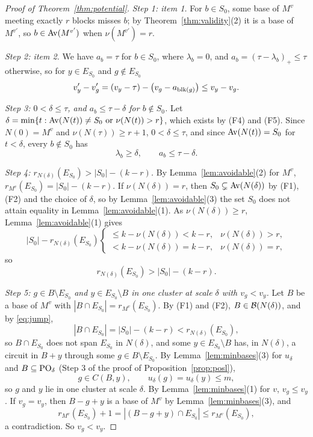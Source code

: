 \begin{proof}[Proof of Theorem~\ref{thm:potential}]
\emph{Step 1: item 1.}  For $b\in S_0$, some base of $M^{v}$ meeting exactly $r$
blocks misses $b$; by Theorem~\ref{thm:validity}(2) it is a base of $M^{v'}$, so
$b\in\operatorname{Av}(M^{v'})$ when $\nu(M^{v'})=r$.

\emph{Step 2: item 2.}  We have $a_b=\tau$ for $b\in S_0$, where $\lambda_b=0$,
and $a_b=(\tau-\lambda_b)_+\le\tau$ otherwise, so for $y\in E_{S_0}$ and
$g\notin E_{S_0}$
\[
  v'_y-v'_g=(v_y-\tau)-\bigl(v_g-a_{\operatorname{blk}(g)}\bigr)\le v_y-v_g.
\]

\emph{Step 3: $0<\delta\le\tau$, and $a_b\le\tau-\delta$ for $b\notin S_0$.}  Let
$\delta=\min\{t:\operatorname{Av}(N(t))\ne S_0\text{ or }\nu(N(t))>r\}$, which exists by (F4)
and (F5).  Since $N(0)=M^{v}$ and $\nu(N(\tau))\ge r+1$, $0<\delta\le\tau$, and
since $\operatorname{Av}(N(t))=S_0$ for $t<\delta$, every $b\notin S_0$ has
\[
  \lambda_b\ge\delta,\qquad a_b\le\tau-\delta.
\]

\emph{Step 4: $r_{N(\delta)}(E_{S_0})>|S_0|-(k-r)$.}  By Lemma~\ref{lem:avoidable}(2) for $M^{v}$,
$r_{M^{v}}(E_{S_0})=|S_0|-(k-r)$.  If $\nu(N(\delta))=r$, then
$S_0\subsetneq\operatorname{Av}(N(\delta))$ by (F1), (F2) and the choice of $\delta$, so by
Lemma~\ref{lem:avoidable}(3) the set $S_0$ does not attain equality in
Lemma~\ref{lem:avoidable}(1).  As $\nu(N(\delta))\ge r$, Lemma~\ref{lem:avoidable}(1)
gives
\[
  |S_0|-r_{N(\delta)}(E_{S_0})
  \begin{cases}
    \le k-\nu(N(\delta))<k-r,&\nu(N(\delta))>r,\\
    <k-\nu(N(\delta))=k-r,&\nu(N(\delta))=r,
  \end{cases}
\]
so
\begin{equation}
  r_{N(\delta)}(E_{S_0})>|S_0|-(k-r).
  \label{eq:jump}
\end{equation}

\emph{Step 5: $g\in B\setminus E_{S_0}$ and $y\in E_{S_0}\setminus B$ in one cluster at scale $\delta$ with $v_g<v_y$.}  Let $B$ be a base of $M^{v}$ with
$|B\cap E_{S_0}|=r_{M^{v}}(E_{S_0})$.  By (F1) and (F2), $B\in\mathcal B(N(\delta))$, and
by \eqref{eq:jump},
\[
  |B\cap E_{S_0}|=|S_0|-(k-r)<r_{N(\delta)}(E_{S_0}),
\]
so $B\cap E_{S_0}$ does not span $E_{S_0}$ in $N(\delta)$, and some
$y\in E_{S_0}\setminus B$ has, in $N(\delta)$, a circuit in $B+y$ through some
$g\in B\setminus E_{S_0}$.  By Lemma~\ref{lem:minbases}(3) for $u_\delta$ and
$B\subseteq\mathrm{PO}_\delta$ (Step 3 of the proof of Proposition~\ref{prop:posl}),
\[
  g\in C(B,y),\qquad u_\delta(g)=u_\delta(y)\le m,
\]
so $g$ and $y$ lie in one cluster at scale $\delta$.  By Lemma~\ref{lem:minbases}(1)
for $v$, $v_g\le v_y$.  If $v_g=v_y$, then $B-g+y$ is a base of $M^{v}$ by
Lemma~\ref{lem:minbases}(3), and
\[
  r_{M^{v}}(E_{S_0})+1=|(B-g+y)\cap E_{S_0}|\le r_{M^{v}}(E_{S_0}),
\]
a contradiction.  So $v_g<v_y$.


\end{proof}
